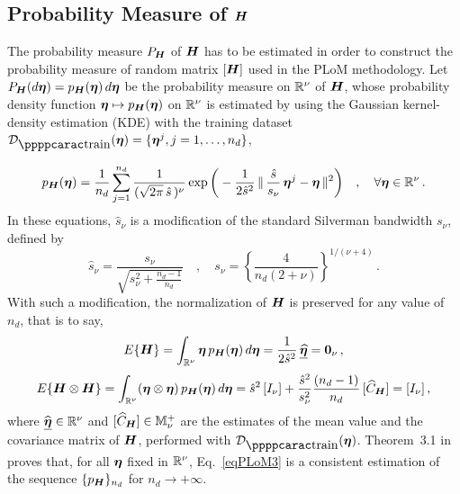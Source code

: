 \subsection[Probability Measure of H]{Probability Measure of ${\boldsymbol{H}}$}
\label{sec:PLoM.2}

The probability measure $P_{\boldsymbol{H}}$ of ${\boldsymbol{H}}$ has to be estimated in order to construct the probability measure of random matrix $[{\boldsymbol{H}}]$ used in the PLoM methodology. Let $P_{\boldsymbol{H}}(d{\boldsymbol{\eta}}) = p_{\boldsymbol{H}}({\boldsymbol{\eta}})\, d{\boldsymbol{\eta}}$ be the probability measure on ${\mathbb{R}}^\nu$ of ${\boldsymbol{H}}$, whose probability density function ${\boldsymbol{\eta}}\mapsto p_{\boldsymbol{H}}({\boldsymbol{\eta}})$ on ${\mathbb{R}}^\nu$ is estimated by using the Gaussian kernel-density estimation (KDE) with the training dataset $\curD_\ptraining(\bfeta) = \{\bfeta^j,j=1,\ldots,n_d\}$,

\begin{equation}\label{eqPLoM3}
 p_{\boldsymbol{H}}({\boldsymbol{\eta}}) = \frac{1}{n_d}\sum_{j=1}^{n_d} \frac{1}{ (\sqrt{2\pi}\, \hat s \,)^{\nu}}\exp\bigg ( -\frac{1}{2\hat s^2}\,\Vert\,\frac{\hat s }{s_\nu} \, {\boldsymbol{\eta}}^j - {\boldsymbol{\eta}}\,\Vert^2 \bigg ) \quad , \quad  \forall{\boldsymbol{\eta}}\in{\mathbb{R}}^\nu \, .
\end{equation}
%
In these equations, $\hat s_{\nu}$  is a modification of the standard Silverman bandwidth $s_{\nu}$, defined by
%
\begin{equation}\nonumber
\hat s_{\nu} =   \frac{s_{\nu}}{\sqrt{s_{\nu}^2 +\frac{n_d -1}{n_d}}} \quad , \quad
s_{\nu} = \left\{\frac{4}{n_d(2+\nu)} \right\}^{1/(\nu +4)}   \, .    \nonumber
\end{equation}
%
%
With such a modification, the normalization of ${\boldsymbol{H}}$ is preserved for any value of $n_d$, that is to say,
%
\begin{equation}\nonumber
E\{{\boldsymbol{H}}\} = \int_{{\mathbb{R}}^\nu} {\boldsymbol{\eta}}\, p_{\boldsymbol{H}}({\boldsymbol{\eta}})\, d{\boldsymbol{\eta}} = \frac{1}{2\hat s^2}\,\underline{\widehat{{\boldsymbol{\eta}}}} = { \hbox{\bf 0} }_\nu\, ,
\end{equation}
%
\begin{equation}\nonumber
E\{{\boldsymbol{H}}\otimes{\boldsymbol{H}}\} = \int_{{\mathbb{R}}^\nu} ({\boldsymbol{\eta}}\otimes{\boldsymbol{\eta}})\, p_{\boldsymbol{H}}({\boldsymbol{\eta}})\, d{\boldsymbol{\eta}} = \hat s^2 \,[I_\nu] +
     \frac{\hat s^2}{s_\nu^2} \frac{(n_d-1)}{n_d}\,[\widehat C_{\boldsymbol{H}}] = [I_\nu]\, ,
\end{equation}
%
where $\widehat{\underline{{\boldsymbol{\eta}}}}\in{\mathbb{R}}^\nu$ and $[\widehat C_{\boldsymbol{H}}]\in{\mathbb{M}}_{\nu}^+$ are the estimates of the mean value and the covariance matrix of ${\boldsymbol{H}}$, performed with $\curD_\ptraining(\bfeta)$.
Theorem~3.1 in \cite{Soize2020c} proves that, for all ${\boldsymbol{\eta}}$ fixed in ${\mathbb{R}}^\nu$, Eq.~\eqref{eqPLoM3}  is a consistent estimation of the sequence $\{p_{\boldsymbol{H}}\}_{n_d}$ for $n_d\rightarrow +\infty$.


